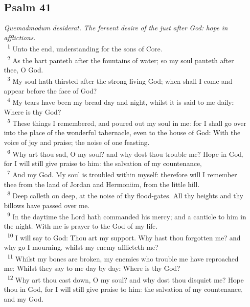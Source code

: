 \documentclass[a5paper,12pt]{article}
\begin{document}
\begin{multicols*}{2}
\section{Psalm 41}
\label{sec:org3835370}
\emph{Quemadmodum desiderat. The fervent desire of the just after God: hope in afflictions.}\\

~\textsuperscript{1} Unto the end, understanding for the sons of Core.\\
~\textsuperscript{2} As the hart panteth after the fountains of water; so my soul panteth after thee, O God.\\
~\textsuperscript{3} My soul hath thirsted after the strong living God; when shall I come and appear before the face of God?\\
~\textsuperscript{4} My tears have been my bread day and night, whilst it is said to me daily: Where is thy God?\\
~\textsuperscript{5} These things I remembered, and poured out my soul in me: for I shall go over into the place of the wonderful tabernacle, even to the house of God: With the voice of joy and praise; the noise of one feasting.\\
~\textsuperscript{6} Why art thou sad, O my soul? and why dost thou trouble me? Hope in God, for I will still give praise to him: the salvation of my countenance,\\
~\textsuperscript{7} And my God. My soul is troubled within myself: therefore will I remember thee from the land of Jordan and Hermoniim, from the little hill.\\
~\textsuperscript{8} Deep calleth on deep, at the noise of thy flood-gates. All thy heights and thy billows have passed over me.\\
~\textsuperscript{9} In the daytime the Lord hath commanded his mercy; and a canticle to him in the night. With me is prayer to the God of my life.\\
~\textsuperscript{10} I will say to God: Thou art my support. Why hast thou forgotten me? and why go I mourning, whilst my enemy afflicteth me?\\
~\textsuperscript{11} Whilst my bones are broken, my enemies who trouble me have reproached me; Whilst they say to me day by day: Where is thy God?\\
~\textsuperscript{12} Why art thou cast down, O my soul? and why dost thou disquiet me? Hope thou in God, for I will still give praise to him: the salvation of my countenance, and my God.\\


\end{multicols*}
\end{document}
